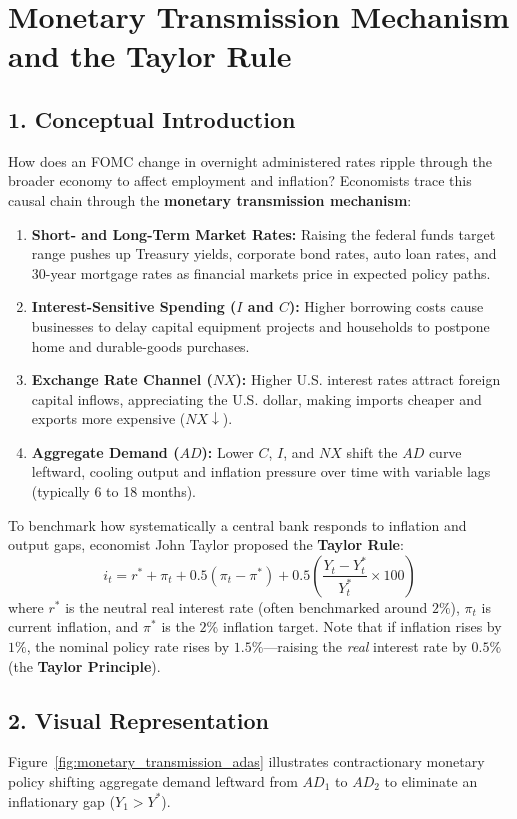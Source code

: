 \documentclass[11pt,letterpaper]{article}
\begin{document}
\section{Monetary Transmission Mechanism and the Taylor Rule}

\subsection*{1. Conceptual Introduction}
How does an FOMC change in overnight administered rates ripple through the broader economy to affect employment and inflation? Economists trace this causal chain through the \textbf{monetary transmission mechanism}:
\begin{enumerate}
    \item \textbf{Short- and Long-Term Market Rates:} Raising the federal funds target range pushes up Treasury yields, corporate bond rates, auto loan rates, and 30-year mortgage rates as financial markets price in expected policy paths.
    \item \textbf{Interest-Sensitive Spending ($I$ and $C$):} Higher borrowing costs cause businesses to delay capital equipment projects and households to postpone home and durable-goods purchases.
    \item \textbf{Exchange Rate Channel ($NX$):} Higher U.S. interest rates attract foreign capital inflows, appreciating the U.S. dollar, making imports cheaper and exports more expensive ($NX \downarrow$).
    \item \textbf{Aggregate Demand ($AD$):} Lower $C$, $I$, and $NX$ shift the $AD$ curve leftward, cooling output and inflation pressure over time with variable lags (typically 6 to 18 months).
\end{enumerate}

To benchmark how systematically a central bank responds to inflation and output gaps, economist John Taylor proposed the \textbf{Taylor Rule}:
\begin{equation}
i_t = r^* + \pi_t + 0.5(\pi_t - \pi^*) + 0.5\left(\frac{Y_t - Y_t^*}{Y_t^*} \times 100\right)
\end{equation}
where $r^*$ is the neutral real interest rate (often benchmarked around $2\%$), $\pi_t$ is current inflation, and $\pi^*$ is the $2\%$ inflation target. Note that if inflation rises by $1\%$, the nominal policy rate rises by $1.5\%$—raising the \emph{real} interest rate by $0.5\%$ (the \textbf{Taylor Principle}).

\subsection*{2. Visual Representation}
Figure~\ref{fig:monetary_transmission_adas} illustrates contractionary monetary policy shifting aggregate demand leftward from $AD_1$ to $AD_2$ to eliminate an inflationary gap ($Y_1 > Y^*$).
\end{document}
